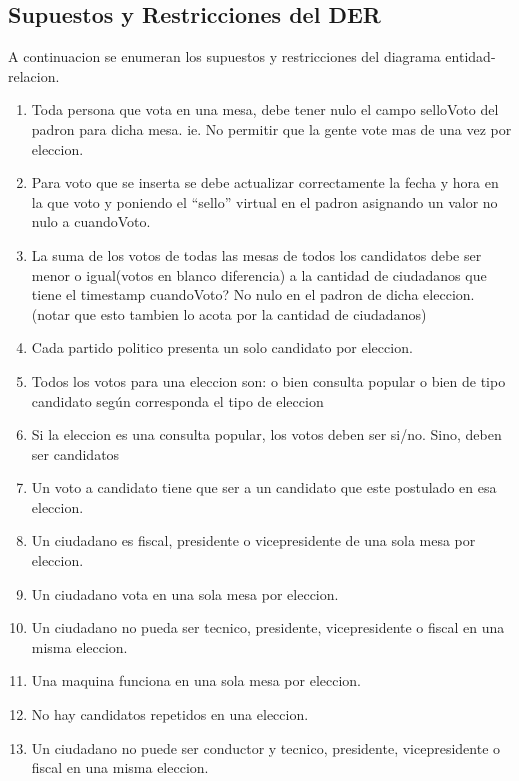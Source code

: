 \subsection{Supuestos y Restricciones del DER}
A continuacion se enumeran los supuestos y restricciones del diagrama entidad-relacion.

\begin{enumerate}
	\item Toda persona que vota en una mesa, debe tener nulo el campo selloVoto del padron para dicha mesa. ie. No permitir que la gente vote mas de una vez por eleccion.
	\item  Para voto que se inserta se debe actualizar correctamente la fecha y hora en la que voto y poniendo el “sello” virtual en el padron asignando un valor no nulo a cuandoVoto.
	\item  La suma de los votos de todas las mesas de todos los candidatos debe ser menor o igual(votos en blanco diferencia) a la cantidad de ciudadanos que tiene el timestamp cuandoVoto? No nulo en el padron de dicha eleccion. (notar que esto tambien lo acota por la cantidad de ciudadanos)
	\item  Cada partido politico presenta un solo candidato por eleccion.
	\item  Todos los votos para una eleccion son: o bien consulta popular o bien de tipo candidato según corresponda el tipo de eleccion
	\item Si la eleccion es una consulta popular, los votos deben ser si/no. Sino, deben ser candidatos
	\item Un voto a candidato tiene que ser a un candidato que este postulado en esa eleccion.
	\item Un ciudadano es fiscal, presidente o vicepresidente de una sola mesa por eleccion.
	\item Un ciudadano vota en una sola mesa por eleccion.
	\item Un ciudadano no pueda ser tecnico, presidente, vicepresidente o fiscal en una misma eleccion.
	\item Una maquina funciona en una sola mesa por eleccion.
	\item No hay candidatos repetidos en una eleccion.
	\item Un ciudadano no puede ser conductor y tecnico, presidente, vicepresidente o fiscal en una misma eleccion.
\end{enumerate}